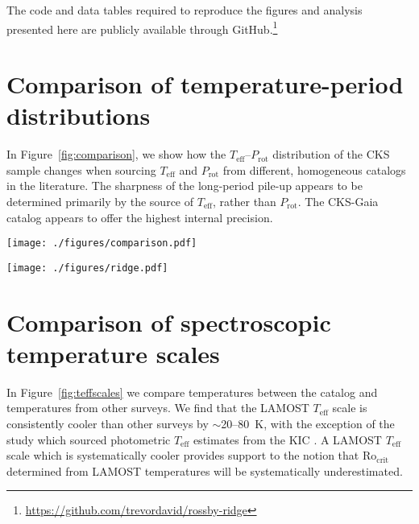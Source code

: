 \documentclass[linenumbers,trackchanges,twocolumn]{aastex631}
\newcommand{\rocrit}{$\mathrm{Ro_{crit}}$\xspace}
\newcommand{\teff}{\ensuremath{T_{\mathrm{eff}}}\xspace}
\newcommand{\prot}{\ensuremath{P_\mathrm{rot}}\xspace}
\begin{document}
The code and data tables required to reproduce the figures and analysis presented here are publicly available through GitHub.\footnote{\url{https://github.com/trevordavid/rossby-ridge}}

\appendix
\section{Comparison of temperature-period distributions}\label{app:teffprot}
In Figure~\ref{fig:comparison}, we show how the \teff--\prot distribution of the CKS sample changes when sourcing \teff and \prot from different, homogeneous catalogs in the literature. The sharpness of the long-period pile-up appears to be determined primarily by the source of \teff, rather than \prot. The CKS-Gaia catalog \citep{Fulton2018} appears to offer the highest internal precision.  

\begin{figure*}
    \centering
    \texttt{[image: ./figures/comparison.pdf]}
    \caption{Comparison of the \teff--\prot distribution for the CKS sample using rotation periods and \teff from the sources indicated by the axes labels.}
    \label{fig:comparison}
\end{figure*}

\begin{figure*}
    \centering
    \texttt{[image: ./figures/ridge.pdf]}
    \caption{The \teff-\prot plane for the CKS sample. Point colors are scaled to the CKS ages determined from isochrone fitting. The source of \prot is denoted above each panel, where \citet{David2021} is a compilation of vetted periods, rather than a source of original measurements. The black trapezoid indicates the approximate area of the ridge. The grey curves indicate empirical cluster sequences from \citet{Curtis2020}, corresponding to ages of $\sim$2.7, 1, 0.67, and 0.12~Gyr from top to bottom.}
    \label{fig:ridge}
\end{figure*}

\section{Comparison of spectroscopic temperature scales}\label{app:teff}

In Figure~\ref{fig:teffscales} we compare temperatures between the  catalog \citep{Xiang2019} and temperatures from other surveys. We find that the LAMOST \teff scale is consistently cooler than other surveys by $\sim$20--80~K, with the exception of the \citet{McQuillan2014} study which sourced photometric \teff estimates from the KIC \citep{Brown2011}. A LAMOST \teff scale which is systematically cooler provides support to the notion that \rocrit determined from LAMOST temperatures will be systematically underestimated. 
\end{document}

